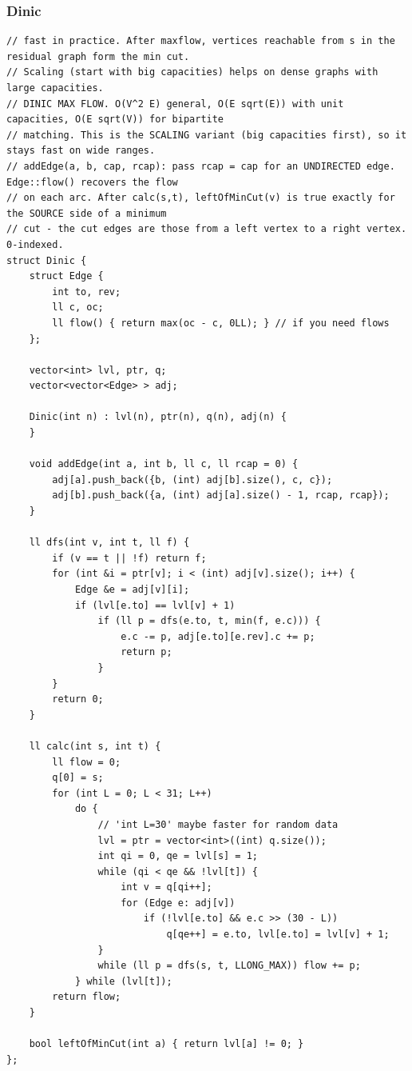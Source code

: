 \documentclass[9pt,a4paper,twocolumn]{extarticle}
\begin{document}
\filbreak
\subsubsection{Dinic}
\nopagebreak
\begin{lstlisting}
// fast in practice. After maxflow, vertices reachable from s in the residual graph form the min cut.
// Scaling (start with big capacities) helps on dense graphs with large capacities.
// DINIC MAX FLOW. O(V^2 E) general, O(E sqrt(E)) with unit capacities, O(E sqrt(V)) for bipartite
// matching. This is the SCALING variant (big capacities first), so it stays fast on wide ranges.
// addEdge(a, b, cap, rcap): pass rcap = cap for an UNDIRECTED edge. Edge::flow() recovers the flow
// on each arc. After calc(s,t), leftOfMinCut(v) is true exactly for the SOURCE side of a minimum
// cut - the cut edges are those from a left vertex to a right vertex. 0-indexed.
struct Dinic {
    struct Edge {
        int to, rev;
        ll c, oc;
        ll flow() { return max(oc - c, 0LL); } // if you need flows
    };

    vector<int> lvl, ptr, q;
    vector<vector<Edge> > adj;

    Dinic(int n) : lvl(n), ptr(n), q(n), adj(n) {
    }

    void addEdge(int a, int b, ll c, ll rcap = 0) {
        adj[a].push_back({b, (int) adj[b].size(), c, c});
        adj[b].push_back({a, (int) adj[a].size() - 1, rcap, rcap});
    }

    ll dfs(int v, int t, ll f) {
        if (v == t || !f) return f;
        for (int &i = ptr[v]; i < (int) adj[v].size(); i++) {
            Edge &e = adj[v][i];
            if (lvl[e.to] == lvl[v] + 1)
                if (ll p = dfs(e.to, t, min(f, e.c))) {
                    e.c -= p, adj[e.to][e.rev].c += p;
                    return p;
                }
        }
        return 0;
    }

    ll calc(int s, int t) {
        ll flow = 0;
        q[0] = s;
        for (int L = 0; L < 31; L++)
            do {
                // 'int L=30' maybe faster for random data
                lvl = ptr = vector<int>((int) q.size());
                int qi = 0, qe = lvl[s] = 1;
                while (qi < qe && !lvl[t]) {
                    int v = q[qi++];
                    for (Edge e: adj[v])
                        if (!lvl[e.to] && e.c >> (30 - L))
                            q[qe++] = e.to, lvl[e.to] = lvl[v] + 1;
                }
                while (ll p = dfs(s, t, LLONG_MAX)) flow += p;
            } while (lvl[t]);
        return flow;
    }

    bool leftOfMinCut(int a) { return lvl[a] != 0; }
};
\end{lstlisting}
\end{document}
